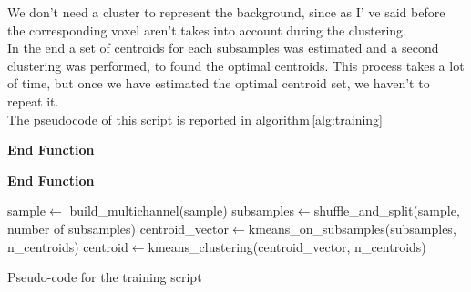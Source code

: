 	
	We don't need a cluster to represent the background, since as I' ve said before the corresponding voxel aren't takes into account during the clustering.\\
	In the end a set of centroids for each subsamples was estimated and a second clustering was performed, to found the optimal centroids. 
	This process takes a lot of time, but once we have estimated the optimal centroid set, we haven't to repeat it.\\
	
	The pseudocode of this script is reported in algorithm\,\ref{alg:training}
		
		
	\begin{algorithm}
	
	\SetAlgoLined
	\DontPrintSemicolon
	
	
	\textbf{End Function}

	\textbf{End Function}
	
	

	sample$\leftarrow$ build\_multichannel(sample)\;
	subsamples$\leftarrow$shuffle\_and\_split(sample, number of subsamples)\;
	centroid\_vector$\leftarrow$kmeans\_on\_subsamples(subsamples, n\_centroids)\;
	centroid$\leftarrow$kmeans\_clustering(centroid\_vector, n\_centroids)\;
	
	\label{alg:training}\caption{Pseudo-code for the training script}
	
\end{algorithm}

	

